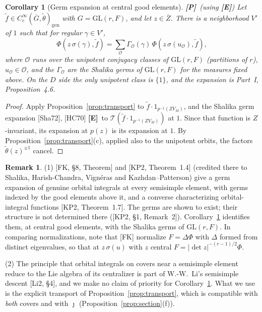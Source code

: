 \documentclass[12pt]{article}
\newcommand{\ov}[1]{\overline{#1}}
\newcommand{\gen}{\mathrm{gen}}
\newcommand{\GL}{\mathrm{GL}}
\newcommand{\Gb}{\ov{G}}
\newcommand{\Zb}{\ov{Z}}
\newcommand{\jj}{\jmath}
\newcommand{\sg}{\sigma}
\newcommand{\Pv}{\textbf{[P]}}
\newcommand{\Ev}{\textbf{[E]}}
\theoremstyle{plain}
\newtheorem{corollary}[theorem]{Corollary}
\theoremstyle{definition}
\newtheorem{remark}[theorem]{Remark}
\begin{document}
\begin{corollary}[Germ expansion at central good elements]\label{cor:germexp}\Pv\ (using \Ev)
Let $\tilde f\in C_c^\infty(\Gb,\tilde\theta)_\gen$ with $G=\GL(r,F)$, and let $z\in\Zb$. There is a neighborhood $V'$ of $1$ such that for regular $\gamma\in V'$,
\[ \Phi(z\,\sg(\gamma),\tilde f)=\sum_{\mathcal O}\Gamma_{\mathcal O}(\gamma)\,\Phi(z\,\sg(u_{\mathcal O}),\tilde f), \]
where $\mathcal O$ runs over the unipotent conjugacy classes of $\GL(r,F)$ (partitions of $r$), $u_{\mathcal O}\in\mathcal O$, and the $\Gamma_{\mathcal O}$ are the Shalika germs of $\GL(r,F)$ for the measures fixed above. On the $D$ side the only unipotent class is $\{1\}$, and the expansion is Part~I, Proposition~4.6.
\end{corollary}
\begin{proof}
Apply Proposition~\ref{prop:transport} to $\tilde f\cdot1_{p^{-1}(ZV_M)}$, and the Shalika germ expansion [Sha72], [HC70] \Ev\ to $\mathcal T(\tilde f\cdot1_{p^{-1}(ZV_M)})$ at $1$. Since that function is $Z$-invariant, its expansion at $p(z)$ is its expansion at $1$. By Proposition~\ref{prop:transport}(c), applied also to the unipotent orbits, the factors $\tilde\theta(z)^{\pm1}$ cancel.
\end{proof}



\begin{remark}\label{rem:FK8}
(1) [FK, \S8, Theorem] and [KP2, Theorem~1.4] (credited there to Shalika, Harish-Chandra, Vign\'eras and Kazhdan--Patterson) give a germ expansion of genuine orbital integrals at every semisimple element, with germs indexed by the good elements above it, and a converse characterizing orbital-integral functions [KP2, Theorem~1.7]. The germs are shown to exist; their structure is not determined there ([KP2, \S1, Remark~2]). Corollary~\ref{cor:germexp} identifies them, at central good elements, with the Shalika germs of $\GL(r,F)$. In comparing normalizations, note that [FK] normalize $F=\Delta\Phi$ with $\Delta$ formed from distinct eigenvalues, so that at $z\,\sg(u)$ with $z$ central $F=|\det z|^{-(r-1)/2}\Phi$.

(2) The principle that orbital integrals on covers near a semisimple element reduce to the Lie algebra of its centralizer is part of W.-W.~Li's semisimple descent [Li2, \S4], and we make no claim of priority for Corollary~\ref{cor:germexp}. What we use is the explicit transport of Proposition~\ref{prop:transport}, which is compatible with \emph{both} covers and with $\jj$ (Proposition~\ref{prop:section}(f)).
\end{remark}
\end{document}

